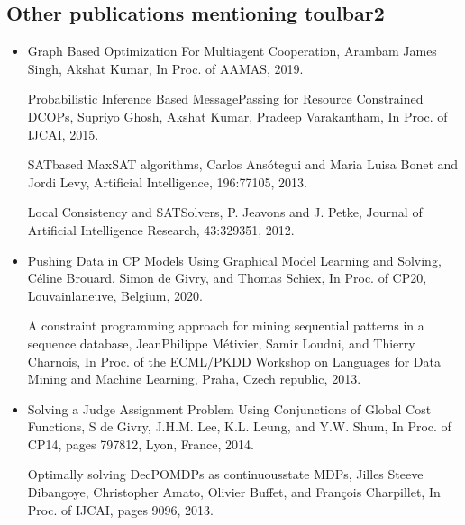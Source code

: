 \documentclass[letterpaper,10pt,openany,oneside,english]{sphinxmanual}
\begin{document}
\subsection{Other publications mentioning toulbar2}
\label{\detokenize{publications:other-publications-mentioning-toulbar2}}\begin{itemize}
\item {} 
\sphinxAtStartPar
{}

\sphinxAtStartPar
Graph Based Optimization For Multiagent Cooperation,
Arambam James Singh, Akshat Kumar, In Proc. of AAMAS, 2019.

\sphinxAtStartPar
Probabilistic Inference Based Message\sphinxhyphen{}Passing for Resource Constrained DCOPs,
Supriyo Ghosh, Akshat Kumar, Pradeep Varakantham, In Proc. of IJCAI, 2015.

\sphinxAtStartPar
SAT\sphinxhyphen{}based MaxSAT algorithms,
Carlos Ansótegui and Maria Luisa Bonet and Jordi Levy,
Artificial Intelligence, 196:77\sphinxhyphen{}105, 2013.

\sphinxAtStartPar
Local Consistency and SAT\sphinxhyphen{}Solvers, P. Jeavons and J. Petke, Journal of Artificial Intelligence Research, 43:329\sphinxhyphen{}351, 2012.

\item {} 
\sphinxAtStartPar
{}

\sphinxAtStartPar
Pushing Data in CP Models Using Graphical Model Learning and Solving,
Céline Brouard, Simon de Givry, and Thomas Schiex,
In Proc. of CP\sphinxhyphen{}20, Louvain\sphinxhyphen{}la\sphinxhyphen{}neuve, Belgium, 2020.

\sphinxAtStartPar
A constraint programming approach for mining sequential patterns in a sequence database,
Jean\sphinxhyphen{}Philippe Métivier, Samir Loudni, and Thierry Charnois,
In Proc. of the ECML/PKDD Workshop on Languages for Data Mining and Machine Learning, Praha, Czech republic, 2013.

\item {} 
\sphinxAtStartPar
{}

\sphinxAtStartPar
Solving a Judge Assignment Problem Using Conjunctions of Global Cost Functions,
S de Givry, J.H.M. Lee, K.L. Leung, and Y.W. Shum,
In Proc. of CP\sphinxhyphen{}14, pages 797\sphinxhyphen{}812, Lyon, France, 2014.

\sphinxAtStartPar
Optimally solving Dec\sphinxhyphen{}POMDPs as continuous\sphinxhyphen{}state MDPs,
Jilles Steeve Dibangoye, Christopher Amato, Olivier Buffet, and François Charpillet,
In Proc. of IJCAI, pages 90\sphinxhyphen{}96, 2013.


\end{itemize}
\end{document}
